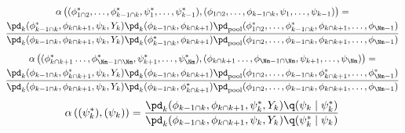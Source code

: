 \begin{multline}
  \alpha \left(
    (\phi_{1 \cap 2}^{*}, \ldots, \phi_{k - 1 \cap k}^{*}, \psi_{1}^{*}, \ldots, \psi_{k - 1}^{*}),
    (\phi_{1 \cap 2}, \ldots, \phi_{k - 1 \cap k}, \psi_{1}, \ldots, \psi_{k - 1})
  \right)
  =\\ 
  \frac {
    \pd_{k}(\phi_{k - 1 \cap k}^{*}, \phi_{k \cap k + 1}, \psi_{k}, Y_{k})
    \pd_{k}(\phi_{k - 1 \cap k}, \phi_{k \cap k + 1})
    \pd_{\text{pool}}(\phi_{1 \cap 2}^{*}, \ldots, \phi_{k - 1 \cap k}^{*}, \phi_{k \cap k + 1}, \ldots, \phi_{\Nm - 1})
  } {
    \pd_{k}(\phi_{k - 1 \cap k}, \phi_{k \cap k + 1}, \psi_{k}, Y_{k})
    \pd_{k}(\phi_{k - 1 \cap k}^{*}, \phi_{k \cap k + 1})
    \pd_{\text{pool}}(\phi_{1 \cap 2}, \ldots, \phi_{k - 1 \cap k}, \phi_{k \cap k + 1}, \ldots, \phi_{\Nm - 1})
  }
  \end{multline}
  \begin{multline}
  \alpha \left(
    (\phi_{k \cap k + 1}^{*} \ldots, \phi_{\Nm - 1 \cap \Nm}^{*}, \psi_{k + 1}^{*}, \ldots, \psi_{\Nm}^{*}),
    (\phi_{k \cap k + 1} \ldots, \phi_{\Nm - 1 \cap \Nm}, \psi_{k + 1}, \ldots, \psi_{\Nm})
  \right)
  =\\
  \frac {
    \pd_{k}(\phi_{k - 1 \cap k}, \phi_{k \cap k + 1}^{*}, \psi_{k}, Y_{k})
    \pd_{k}(\phi_{k - 1 \cap k}, \phi_{k \cap k + 1})
    \pd_{\text{pool}}(\phi_{1 \cap 2}, \ldots, \phi_{k - 1 \cap k}, \phi_{k \cap k + 1}^{*}, \ldots, \phi_{\Nm - 1}^{*})
  } {
    \pd_{k}(\phi_{k - 1 \cap k}, \phi_{k \cap k + 1}, \psi_{k}, Y_{k})
    \pd_{k}(\phi_{k - 1 \cap k}, \phi_{k \cap k + 1}^{*})
    \pd_{\text{pool}}(\phi_{1 \cap 2}, \ldots, \phi_{k - 1 \cap k}, \phi_{k \cap k + 1}, \ldots, \phi_{\Nm - 1})
  } 
  \end{multline}
  \begin{equation}
  \alpha \left(
    (\psi_{k}^{*}),
    (\psi_{k})
  \right)
  = 
  \frac {
    \pd_{k}(\phi_{k - 1 \cap k}, \phi_{k \cap k + 1}, \psi_{k}^{*}, Y_{k})
    \q(\psi_{k} \mid \psi_{k}^{*})
  } {
    \pd_{k}(\phi_{k - 1 \cap k}, \phi_{k \cap k + 1}, \psi_{k}, Y_{k})
    \q(\psi_{k}^{*} \mid \psi_{k})
  }
  \label{eqn:dc-acceptance-probabilities}
\end{equation}